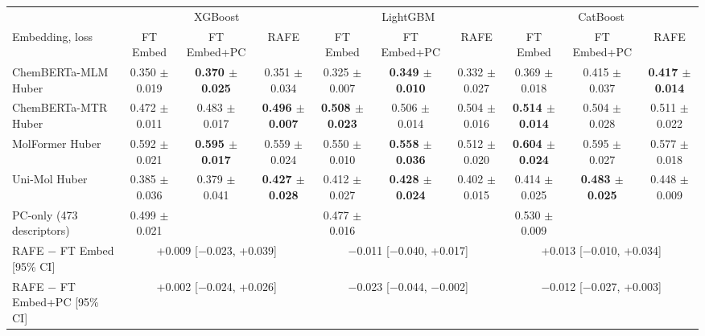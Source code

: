 \begin{tabular}{@{}lccccccccc@{}}
\toprule
 & \multicolumn{3}{c}{XGBoost} & \multicolumn{3}{c}{LightGBM} & \multicolumn{3}{c}{CatBoost} \\
\cmidrule(lr){2-4} \cmidrule(lr){5-7} \cmidrule(lr){8-10}
Embedding, loss & FT Embed & FT Embed+PC & RAFE & FT Embed & FT Embed+PC & RAFE & FT Embed & FT Embed+PC & RAFE \\
\midrule
ChemBERTa-MLM Huber & 0.350 $\pm$ 0.019 & \textbf{0.370 $\pm$ 0.025} & 0.351 $\pm$ 0.034 & 0.325 $\pm$ 0.007 & \textbf{0.349 $\pm$ 0.010} & 0.332 $\pm$ 0.027 & 0.369 $\pm$ 0.018 & 0.415 $\pm$ 0.037 & \textbf{0.417 $\pm$ 0.014} \\
ChemBERTa-MTR Huber & 0.472 $\pm$ 0.011 & 0.483 $\pm$ 0.017 & \textbf{0.496 $\pm$ 0.007} & \textbf{0.508 $\pm$ 0.023} & 0.506 $\pm$ 0.014 & 0.504 $\pm$ 0.016 & \textbf{0.514 $\pm$ 0.014} & 0.504 $\pm$ 0.028 & 0.511 $\pm$ 0.022 \\
MolFormer Huber & 0.592 $\pm$ 0.021 & \textbf{0.595 $\pm$ 0.017} & 0.559 $\pm$ 0.024 & 0.550 $\pm$ 0.010 & \textbf{0.558 $\pm$ 0.036} & 0.512 $\pm$ 0.020 & \textbf{0.604 $\pm$ 0.024} & 0.595 $\pm$ 0.027 & 0.577 $\pm$ 0.018 \\
Uni-Mol Huber & 0.385 $\pm$ 0.036 & 0.379 $\pm$ 0.041 & \textbf{0.427 $\pm$ 0.028} & 0.412 $\pm$ 0.027 & \textbf{0.428 $\pm$ 0.024} & 0.402 $\pm$ 0.015 & 0.414 $\pm$ 0.025 & \textbf{0.483 $\pm$ 0.025} & 0.448 $\pm$ 0.009 \\
\midrule
PC-only (473 descriptors) & 0.499 $\pm$ 0.021 &  &  & 0.477 $\pm$ 0.016 &  &  & 0.530 $\pm$ 0.009 &  &  \\
RAFE $-$ FT Embed [95\% CI] & \multicolumn{3}{c}{+0.009 [$-$0.023, +0.039]} & \multicolumn{3}{c}{$-$0.011 [$-$0.040, +0.017]} & \multicolumn{3}{c}{+0.013 [$-$0.010, +0.034]} \\
RAFE $-$ FT Embed+PC [95\% CI] & \multicolumn{3}{c}{+0.002 [$-$0.024, +0.026]} & \multicolumn{3}{c}{$-$0.023 [$-$0.044, $-$0.002]} & \multicolumn{3}{c}{$-$0.012 [$-$0.027, +0.003]} \\
\bottomrule
\end{tabular}
